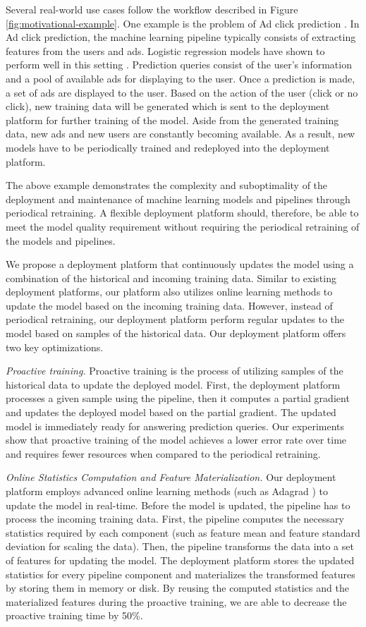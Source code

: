 Several real-world use cases follow the workflow described in Figure \ref{fig:motivational-example}.
One example is the problem of Ad click prediction \cite{macmahan2013}.
In Ad click prediction, the machine learning pipeline typically consists of extracting features from the users and ads. 
Logistic regression models have shown to perform well in this setting \cite{macmahan2013}.
Prediction queries consist of the user's information and a pool of available ads for displaying to the user.
Once a prediction is made, a set of ads are displayed to the user.
Based on the action of the user (click or no click), new training data will be generated which is sent to the deployment platform for further training of the model.
Aside from the generated training data, new ads and new users are constantly becoming available.
As a result, new models have to be periodically trained and redeployed into the deployment platform.

The above example demonstrates the complexity and suboptimality of the deployment and maintenance of machine learning models and pipelines through periodical retraining.
A flexible deployment platform should, therefore, be able to meet the model quality requirement without requiring the periodical retraining of the models and pipelines.

We propose a deployment platform that continuously updates the model using a combination of the historical and incoming training data.
Similar to existing deployment platforms, our platform also utilizes online learning methods to update the model based on the incoming training data.
However, instead of periodical retraining, our deployment platform perform regular updates to the model based on samples of the historical data.
Our deployment platform offers two key optimizations.

\textit{Proactive training.}
Proactive training is the process of utilizing samples of the historical data to update the deployed model.
First, the deployment platform processes a given sample using the pipeline, then it computes a partial gradient and updates the deployed model based on the partial gradient.
The updated model is immediately ready for answering prediction queries.
Our experiments show that proactive training of the model achieves a lower error rate over time and requires fewer resources when compared to the periodical retraining.

\textit{Online Statistics Computation and Feature Materialization.}
Our deployment platform employs advanced online learning methods (such as Adagrad \cite{duchi2011adaptive}) to update the model in real-time.
Before the model is updated, the pipeline has to process the incoming training data.
First, the pipeline computes the necessary statistics required by each component (such as feature mean and feature standard deviation for scaling the data).
Then, the pipeline transforms the data into a set of features for updating the model. 
The deployment platform stores the updated statistics for every pipeline component and materializes the transformed features by storing them in memory or disk.
By reusing the computed statistics and the materialized features during the proactive training, we are able to decrease the proactive training time by 50\%.

